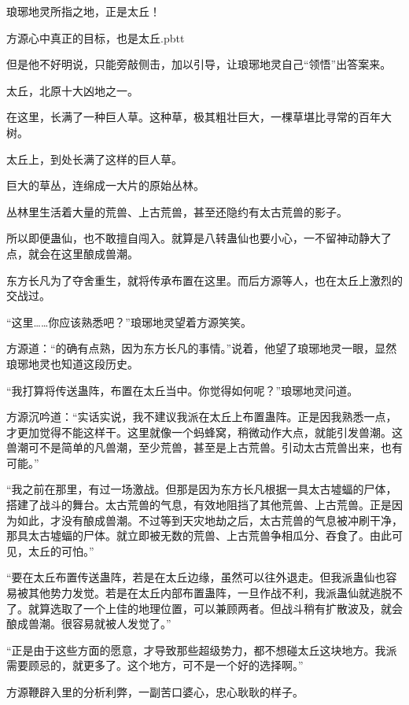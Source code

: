 
\begin{this_body}

琅琊地灵所指之地，正是太丘！

方源心中真正的目标，也是太丘.pbtt

但是他不好明说，只能旁敲侧击，加以引导，让琅琊地灵自己“领悟”出答案来。

太丘，北原十大凶地之一。

在这里，长满了一种巨人草。这种草，极其粗壮巨大，一棵草堪比寻常的百年大树。

太丘上，到处长满了这样的巨人草。

巨大的草丛，连绵成一大片的原始丛林。

丛林里生活着大量的荒兽、上古荒兽，甚至还隐约有太古荒兽的影子。

所以即便蛊仙，也不敢擅自闯入。就算是八转蛊仙也要小心，一不留神动静大了点，就会在这里酿成兽潮。

东方长凡为了夺舍重生，就将传承布置在这里。而后方源等人，也在太丘上激烈的交战过。

“这里……你应该熟悉吧？”琅琊地灵望着方源笑笑。

方源道：“的确有点熟，因为东方长凡的事情。”说着，他望了琅琊地灵一眼，显然琅琊地灵也知道这段历史。

“我打算将传送蛊阵，布置在太丘当中。你觉得如何呢？”琅琊地灵问道。

方源沉吟道：“实话实说，我不建议我派在太丘上布置蛊阵。正是因我熟悉一点，才更加觉得不能这样干。这里就像一个蚂蜂窝，稍微动作大点，就能引发兽潮。这兽潮可不是简单的凡兽潮，至少荒兽，甚至是上古荒兽。引动太古荒兽出来，也有可能。”

“我之前在那里，有过一场激战。但那是因为东方长凡根据一具太古墟蝠的尸体，搭建了战斗的舞台。太古荒兽的气息，有效地阻挡了其他荒兽、上古荒兽。正是因为如此，才没有酿成兽潮。不过等到天灾地劫之后，太古荒兽的气息被冲刷干净，那具太古墟蝠的尸体。就立即被无数的荒兽、上古荒兽争相瓜分、吞食了。由此可见，太丘的可怕。”

“要在太丘布置传送蛊阵，若是在太丘边缘，虽然可以往外退走。但我派蛊仙也容易被其他势力发觉。若是在太丘内部布置蛊阵，一旦作战不利，我派蛊仙就逃脱不了。就算选取了一个上佳的地理位置，可以兼顾两者。但战斗稍有扩散波及，就会酿成兽潮。很容易就被人发觉了。”

“正是由于这些方面的愿意，才导致那些超级势力，都不想碰太丘这块地方。我派需要顾忌的，就更多了。这个地方，可不是一个好的选择啊。”

方源鞭辟入里的分析利弊，一副苦口婆心，忠心耿耿的样子。


\end{this_body}
